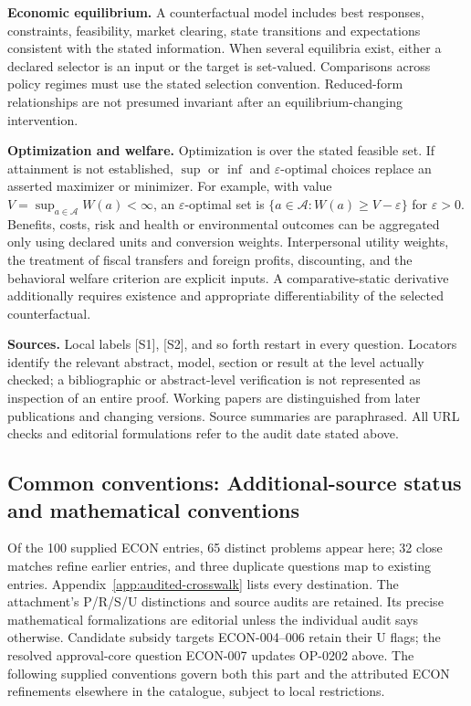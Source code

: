 \documentclass[11pt,a4paper]{article}
\begin{document}
\textbf{Economic equilibrium.} A counterfactual model includes best responses, constraints, feasibility, market clearing, state transitions and expectations consistent with the stated information. When several equilibria exist, either a declared selector is an input or the target is set-valued. Comparisons across policy regimes must use the stated selection convention. Reduced-form relationships are not presumed invariant after an equilibrium-changing intervention.

\textbf{Optimization and welfare.} Optimization is over the stated feasible set. If attainment is not established, $\sup$ or $\inf$ and $\varepsilon$-optimal choices replace an asserted maximizer or minimizer. For example, with value $V=\sup_{a\in\mathcal A}W(a)<\infty$, an $\varepsilon$-optimal set is $\{a\in\mathcal A:W(a)\geq V-\varepsilon\}$ for $\varepsilon>0$. Benefits, costs, risk and health or environmental outcomes can be aggregated only using declared units and conversion weights. Interpersonal utility weights, the treatment of fiscal transfers and foreign profits, discounting, and the behavioral welfare criterion are explicit inputs. A comparative-static derivative additionally requires existence and appropriate differentiability of the selected counterfactual.

\textbf{Sources.} Local labels [S1], [S2], and so forth restart in every question. Locators identify the relevant abstract, model, section or result at the level actually checked; a bibliographic or abstract-level verification is not represented as inspection of an entire proof. Working papers are distinguished from later publications and changing versions. Source summaries are paraphrased. All URL checks and editorial formulations refer to the audit date stated above.

\subsection*{Common conventions: Additional-source status and mathematical conventions}

\label{audited:conventions}

Of the 100 supplied ECON entries, 65 distinct problems appear here; 32 close
matches refine earlier entries, and three duplicate questions map to existing
entries. Appendix~\ref{app:audited-crosswalk} lists every destination.
The attachment's P/R/S/U distinctions and source audits are retained. Its
precise mathematical formalizations are editorial unless the individual audit
says otherwise. Candidate subsidy targets ECON-004--006 retain their U flags;
the resolved approval-core question ECON-007 updates OP-0202 above.
The following supplied conventions govern both this part and the attributed
ECON refinements elsewhere in the catalogue, subject to local restrictions.
\end{document}
